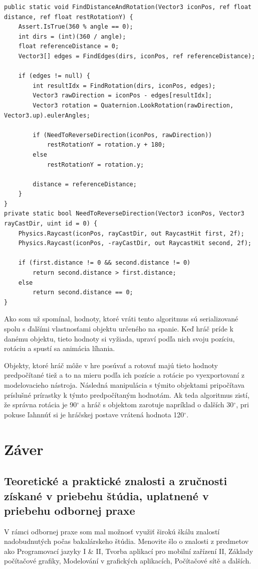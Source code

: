 \documentclass[slovak, bachelorpractice]{diploma}
\begin{document}
\vspace{10pt}
\begin{lstlisting}[label=src:entry,caption={Vstupný bod algoritmu na získanie rotácie a pozície postavy pri ležaní}]
public static void FindDistanceAndRotation(Vector3 iconPos, ref float distance, ref float restRotationY) {
    Assert.IsTrue(360 % angle == 0);
    int dirs = (int)(360 / angle);
    float referenceDistance = 0;
    Vector3[] edges = FindEdges(dirs, iconPos, ref referenceDistance);

    if (edges != null) {
        int resultIdx = FindRotation(dirs, iconPos, edges);
        Vector3 rawDirection = iconPos - edges[resultIdx];
        Vector3 rotation = Quaternion.LookRotation(rawDirection, Vector3.up).eulerAngles;

        if (NeedToReverseDirection(iconPos, rawDirection))
            restRotationY = rotation.y + 180;
        else
            restRotationY = rotation.y;

        distance = referenceDistance;
    }
}
private static bool NeedToReverseDirection(Vector3 iconPos, Vector3 rayCastDir, uint id = 0) {
    Physics.Raycast(iconPos, rayCastDir, out RaycastHit first, 2f);
    Physics.Raycast(iconPos, -rayCastDir, out RaycastHit second, 2f);

    if (first.distance != 0 && second.distance != 0)
        return second.distance > first.distance;
    else
        return second.distance == 0;
}
\end{lstlisting}

Ako som už spomínal, hodnoty, ktoré vráti tento algoritmus sú serializované spolu s ďalšími vlastnosťami objektu určeného na spanie. Keď hráč príde k danému objektu, tieto hodnoty si vyžiada, upraví podľa nich svoju pozíciu, rotáciu a spustí sa animácia líhania.

Objekty, ktoré hráč môže v hre posúvať a rotovať majú tieto hodnoty predpočítané tiež a to na mieru podľa ich pozície a rotácie po vyexportovaní z modelovacieho nástroja. Následná manipulácia s týmito objektami pripočítava príslušné prírastky k týmto predpočítaným hodnotám. Ak teda algoritmus zistí, že správna rotácia je 90$^{\circ}$ a hráč s objektom zarotuje napríklad o ďalších 30$^{\circ}$, pri pokuse ľahnnúť si je hráčskej postave vrátená hodnota 120$^{\circ}$.

\chapter{Záver}
\section{Teoretické a praktické znalosti a zručnosti získané v priebehu štúdia, uplatnené v priebehu odbornej praxe}
V rámci odbornej praxe som mal možnosť využiť širokú škálu znalostí nadobudnutých počas bakalárskeho štúdia. Menovite šlo o znalosti z predmetov ako Programovací jazyky I \& II, Tvorba aplikací pro mobilní zařízení II, Základy počítačové grafiky, Modelování v grafických aplikacích, Počítačové sítě a ďalších. 
\end{document}
